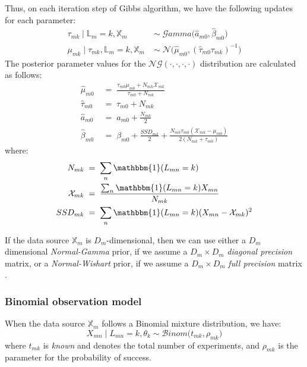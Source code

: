 Thus, on each iteration step of Gibbs algorithm, we have the following updates for each parameter:
\begin{equation}
  \begin{aligned}
  	\tau_{mk} \mid \mathbb{L}_{m}=k, \mathbb{X}_{m} \;& \sim \;\mathcal{G}amma\big(\hat{\mathit{a}}_{m0}, \hat{\beta}_{m0}\big) \\
	\mu_{mk} \mid \tau_{mk}, \mathbb{L}_{m}=k, \mathbb{X}_{m} \; & \sim \; \mathcal{N}\big(\hat{\mu}_{m0}, (\hat{\tau}_{m0} \tau_{mk})^{-1}\big)
  \end{aligned}
\end{equation}
The posterior parameter values for the $\mathcal{NG}(\cdot,\cdot,\cdot,\cdot)$ distribution are calculated as follows:
\begin{equation}
  \begin{aligned}
  	\hat{\mu}_{m0} \; &= \; \frac{\tau_{m0}\mu_{m0} + N_{mk}\mathcal{X}_{mk}}{\tau_{m0} + N_{mk}}\\
  	\hat{\tau}_{m0} \; &= \; \tau_{m0} + N_{mk}\\
  	\hat{\mathit{a}}_{m0} \; &= \; \mathit{a}_{m0} + \frac{N_{mk}}{2}\\
  	\hat{\beta}_{m0} \; &= \; \beta_{m0} + \frac{SSD_{mk}}{2} + \frac{N_{mk}\tau_{m0}(\mathcal{X}_{mk} - \mu_{m0})}{2(N_{mk}+\tau_{m0})}
  \end{aligned}
\end{equation}
where: 
\begin{equation}
  \begin{aligned}
		N_{mk} \; &= \; \sum_{n}\mathbbm{1}(L_{mn}=k)\\ 
		\mathcal{X}_{mk} \; &= \; \frac{\sum_{n}\mathbbm{1}(L_{mn}=k)X_{mn}}{N_{mk}} \\
		SSD_{mk} \; &= \; \sum_{n}\mathbbm{1}(L_{mn}=k)(X_{mn}-\mathcal{X}_{mk})^{2}
  \end{aligned}
\end{equation} 

If the data source $\mathbb{X}_{m}$ is $D_{m}$-dimensional, then we can use either a $D_{m}$ dimensional \emph{Normal-Gamma} prior, if we assume a $D_{m} \times D_{m}$ \emph{diagonal precision} matrix, or a \emph{Normal-Wishart} prior, if we assume a $D_{m} \times D_{m}$ \emph{full precision} matrix \cite[Ch. 2]{Bishop2006}.

\subsubsection*{Binomial observation model}
When the data source $\mathbb{X}_{m}$ follows a Binomial mixture distribution, we have:
\begin{equation}
	X_{mn} \mid L_{mn} = k, \theta_{k} \sim \mathcal{B}inom\big(t_{mk}, \rho_{mk}\big)
\end{equation}
where $t_{mk}$ is \emph{known} and denotes the total number of experiments, and $\rho_{mk}$ is the parameter for the probability of success.

